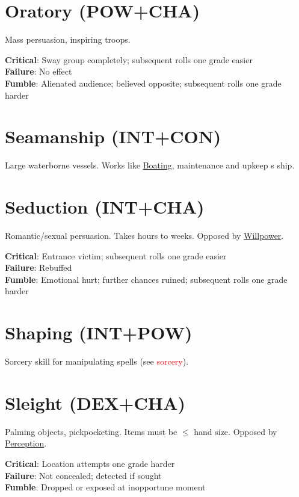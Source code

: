 \documentclass[10pt]{article}
\begin{document}
\section{Oratory (POW+CHA)}
\label{skill:oratory}

Mass persuasion, inspiring troops.

\textbf{Critical}: Sway group completely; subsequent rolls one grade easier\\
\textbf{Failure}: No effect\\
\textbf{Fumble}: Alienated audience; believed opposite; subsequent rolls one grade harder

\section{Seamanship (INT+CON)}
\label{skill:seamanship}

Large waterborne vessels. Works like \hyperref[skill:boating]{Boating}, maintenance and upkeep s ship.

\section{Seduction (INT+CHA)}
\label{skill:seduction}

Romantic/sexual persuasion. Takes hours to weeks. Opposed by \hyperref[skill:willpower]{Willpower}.

\textbf{Critical}: Entrance victim; subsequent rolls one grade easier\\
\textbf{Failure}: Rebuffed\\
\textbf{Fumble}: Emotional hurt; further chances ruined; subsequent rolls one grade harder

\section{Shaping (INT+POW)}
\label{skill:shaping}

Sorcery skill for manipulating spells (see \textcolor{red}{sorcery}).

\section{Sleight (DEX+CHA)}
\label{skill:sleight}

Palming objects, pickpocketing. Items must be $\leq$ hand size. Opposed by \hyperref[skill:perception]{Perception}.

\textbf{Critical}: Location attempts one grade harder\\
\textbf{Failure}: Not concealed; detected if sought\\
\textbf{Fumble}: Dropped or exposed at inopportune moment
\end{document}
